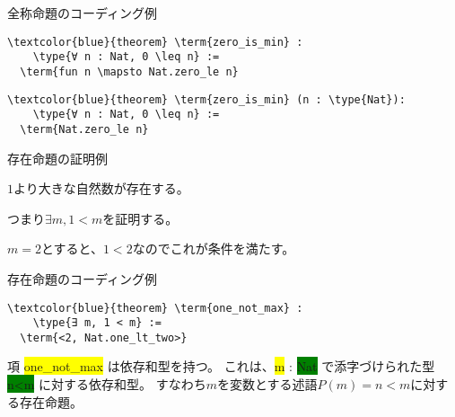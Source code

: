 \documentclass[unicode,12pt]{beamer}%
\newcommand{\type}[1]{\colorbox{green}{#1}}
\newcommand{\term}[1]{\colorbox{yellow}{#1}}
\begin{document}
\begin{frame}[fragile]{全称命題のコーディング例}
  \begin{tcolorbox}[title=Quantifier.lean]
  \setlength{\baselineskip}{12pt}
  \begin{Verbatim}[commandchars=\\\{\}, baselinestretch=1.5]
\textcolor{blue}{theorem} \term{zero_is_min} :
    \type{∀ n : Nat, 0 \leq n} :=
  \term{fun n \mapsto Nat.zero_le n}
  \end{Verbatim}
  \end{tcolorbox}
  \begin{tcolorbox}[title=Quantifier.lean]
  \setlength{\baselineskip}{12pt}
  \begin{Verbatim}[commandchars=\\\{\}, baselinestretch=1.5]
\textcolor{blue}{theorem} \term{zero_is_min} (n : \type{Nat}):
    \type{∀ n : Nat, 0 \leq n} :=
  \term{Nat.zero_le n}
  \end{Verbatim}
  \end{tcolorbox}    
\end{frame}

\begin{frame}{存在命題の証明例}
  \begin{theorem}
    $1$より大きな自然数が存在する。    
  \end{theorem}

  つまり$\exists m, 1 < m$を証明する。

  \begin{problem}
    $m=2$とすると、$1 < 2$なのでこれが条件を満たす。    
  \end{problem}
\end{frame}

\begin{frame}[fragile]{存在命題のコーディング例}
  \begin{tcolorbox}[title=Quantifier.lean]
  \setlength{\baselineskip}{12pt}
  \begin{Verbatim}[commandchars=\\\{\}, baselinestretch=1.5]
\textcolor{blue}{theorem} \term{one_not_max} :
    \type{∃ m, 1 < m} :=
  \term{<2, Nat.one_lt_two>}
  \end{Verbatim}
  \end{tcolorbox}  

  項 \term{one\_not\_max} は依存和型を持つ。
  これは、\term{m} : \type{Nat} で添字づけられた型 \type{n<m} に対する依存和型。
  すなわち$m$を変数とする述語$P(m)=n<m$に対する存在命題。
\end{frame}
\end{document}
